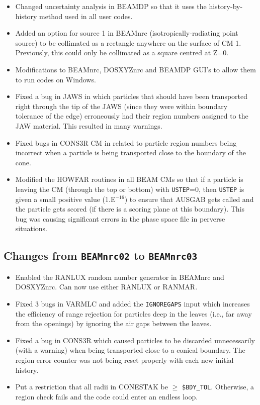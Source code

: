 \documentclass[12pt,twoside]{article}
\begin{document}
\begin{itemize}
\item Changed uncertainty analysis in BEAMDP so that it uses the
history-by-history method used in all user codes.

\item Added an option for source 1 in BEAMnrc (isotropically-radiating
point source) to be collimated as a rectangle anywhere on the surface of
CM 1.  Previously, this could only be collimated as a square centred at
Z=0.

\item Modifications to BEAMnrc, DOSXYZnrc and BEAMDP GUI's to allow them
to run codes on Windows.

\item Fixed a bug in JAWS in which particles that should have been transported
right through the tip of the JAWS (since they were within boundary tolerance
of the edge) erroneously had their region numbers assigned to the JAW
material.  This resulted in many warnings.

\item Fixed bugs in CONS3R CM in related to particle region numbers being
incorrect when a particle is being transported close to the boundary
of the cone.

\item Modified the HOWFAR routines in all BEAM CMs so that if a particle
is leaving the CM (through the top or bottom) with {\tt USTEP}=0, then
{\tt USTEP} is given a small positive value (1.E$^{-16}$) to ensure that
AUSGAB gets called and the particle gets scored (if there is a scoring
plane at this boundary). This bug was causing significant errors in the
phase space file in perverse situations.

\end{itemize}

\subsection{Changes from {\tt BEAMnrc02} to {\tt BEAMnrc03}}

\begin{itemize}

\item Enabled the RANLUX random number generator in BEAMnrc and
DOSXYZnrc.  Can now use either RANLUX or RANMAR.

\item Fixed 3 bugs in VARMLC and added the {\tt IGNOREGAPS} input which
increases the efficiency of range rejection for particles deep in the
leaves (i.e., far away from the openings) by ignoring the air gaps between
the leaves.

\item Fixed a bug in CONS3R which caused particles to be discarded
unnecessarily (with a warning) when being transported close to a conical
boundary.  The region error counter was not being reset properly with
each new initial history.

\item Put a restriction that all radii in CONESTAK be $\geq$ {\tt \$BDY\_TOL}.
Otherwise, a region check fails and the code could enter an endless
loop.

\end{itemize}
\end{document}
